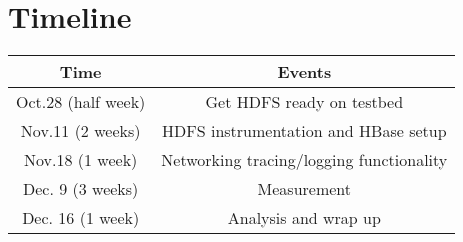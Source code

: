 \section{Timeline}
\label{section:timeline}

\begin{table}[thb]
\centering
\begin{tabular}{|c|c|} \hline
Time & Events\\ \hline
Oct.28 (half week) & Get HDFS ready on testbed\\ \hline
Nov.11 (2 weeks) & HDFS instrumentation and HBase setup\\ \hline
Nov.18 (1 week) & Networking tracing/logging functionality\\ \hline
Dec. 9 (3 weeks) & Measurement\\ \hline
Dec. 16 (1 week) & Analysis and wrap up\\ \hline
\end{tabular}\label{t:timeline}
\end{table}


